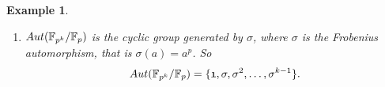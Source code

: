 \documentclass[12pt]{article}
\theoremstyle{plain}
\newtheorem{example}{Example}
\theoremstyle{definition}
\theoremstyle{remark}
\begin{document}
\begin{example}
\begin{enumerate}
So $Aut(\Q(\sqrt{2}, \sqrt{3})/\Q) = \{\mathfrak{1}, \sigma, \tau, \rho\}$. However, we can say something more. We see that $$\sigma^2=\tau^2=\rho^2=\mathfrak{1}$$
and it is not hard to see that $\rho = \sigma\tau = \tau\sigma$. So, in this case we see that $Aut(\Q(\sqrt{2},\sqrt{3})/\Q)$ is an Abelian group that is generated by two elements or that
$$Aut(\Q(\sqrt{2}, \sqrt{3})/\Q) = \{\mathfrak{1}, \sigma, \tau, \sigma\tau\}.$$ This is the smallest non-cyclic group and is also called the ``Klein-$4$ group".

\item $Aut(\mathbb{F}_{p^k}/\mathbb{F}_p)$ is the cyclic group generated by $\sigma$, where $\sigma $ is the Frobenius automorphism, that is $\sigma(a)=a^p$. So
$$Aut(\mathbb{F}_{p^k}/\mathbb{F}_p) = \{\mathfrak{1}, \sigma, \sigma^2, \dots, \sigma^{k-1}\}.$$
\end{enumerate}
\end{example}
\end{document}
